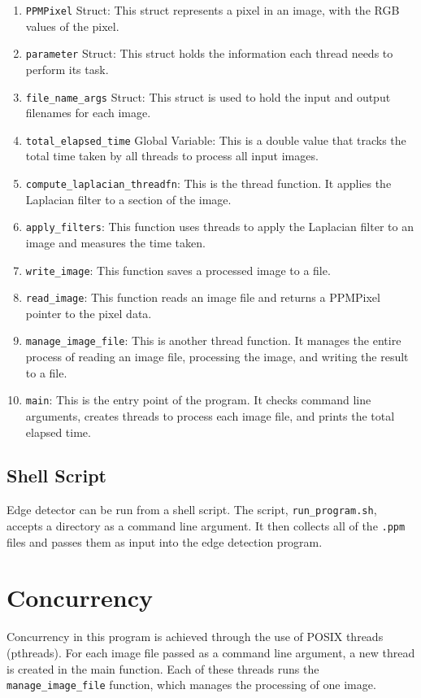 \documentclass{article}
\begin{document}
\begin{enumerate}
  \item \texttt{PPMPixel} Struct: This struct represents a pixel in an image, with the RGB values of the pixel.
  \item \texttt{parameter} Struct: This struct holds the information each thread needs to perform its task.
  \item \texttt{file\_name\_args} Struct: This struct is used to hold the input and output filenames for each image.
  \item \texttt{total\_elapsed\_time} Global Variable: This is a double value that tracks the total time taken by all threads to process all input images.
  \item \texttt{compute\_laplacian\_threadfn}: This is the thread function. It applies the Laplacian filter to a section of the image.
  \item \texttt{apply\_filters}: This function uses threads to apply the Laplacian filter to an image and measures the time taken.
  \item \texttt{write\_image}: This function saves a processed image to a file.
  \item \texttt{read\_image}: This function reads an image file and returns a PPMPixel pointer to the pixel data.
  \item \texttt{manage\_image\_file}: This is another thread function. It manages the entire process of reading an image file, processing the image, and writing the result to a file.
  \item \texttt{main}: This is the entry point of the program. It checks command line arguments, creates threads to process each image file, and prints the total elapsed time.
\end{enumerate}

\subsection*{Shell Script}
Edge detector can be run from a shell script.
The script, \texttt{run\_program.sh}, accepts a directory as a command line argument.
It then collects all of the \texttt{.ppm} files and passes them as input into the edge detection program.

\clearpage
\section*{Concurrency}
Concurrency in this program is achieved through the use of POSIX threads (pthreads).
For each image file passed as a command line argument,
a new thread is created in the main function.
Each of these threads runs the \texttt{manage\_image\_file} function,
which manages the processing of one image.\\
\end{document}
